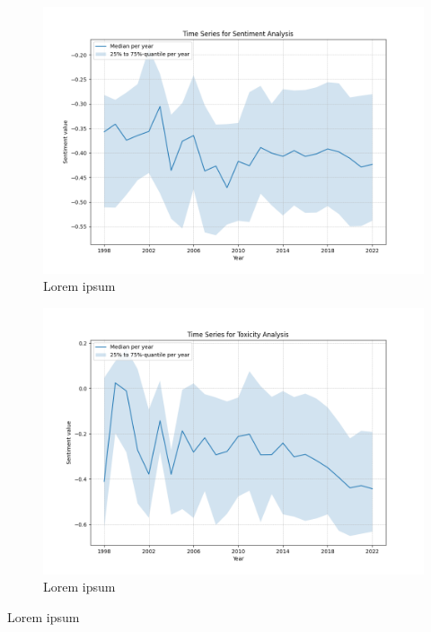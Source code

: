 \begin{figure}[!htb]
    \centering
    \includegraphics[width=\textwidth]{figures/time_series_sentiment.png}
    \caption[]{Lorem ipsum}
\end{figure}

\begin{figure}[!htb]
    \centering
    \includegraphics[width=\textwidth]{figures/time_series_toxicity.png}
    \caption[]{Lorem ipsum}
\end{figure}

Lorem ipsum